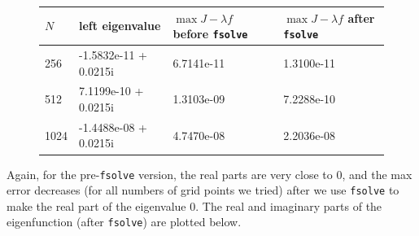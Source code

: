 \documentclass[12pt]{article}
\begin{document}
\begin{figure}[H]
\begin{tabular}{l|lll}
  $N$   & left eigenvalue &  $\max J -\lambda f$ before \texttt{fsolve}  &  $\max J -\lambda f$ after \texttt{fsolve} \\ \hline
  256   &  -1.5832e-11 + 0.0215i &  6.7141e-11  &  1.3100e-11   \\ 
  512   &   7.1199e-10 + 0.0215i &  1.3103e-09  &  7.2288e-10   \\ 
  1024  &  -1.4488e-08 + 0.0215i &  4.7470e-08  &  2.2036e-08 \\
\end{tabular}
\end{figure}

Again, for the pre-\texttt{fsolve} version, the real parts are very close to 0, and the max error decreases (for all numbers of grid points we tried) after we use \texttt{fsolve} to make the real part of the eigenvalue 0. The real and imaginary parts of the eigenfunction (after \texttt{fsolve}) are plotted below.
\end{document}
